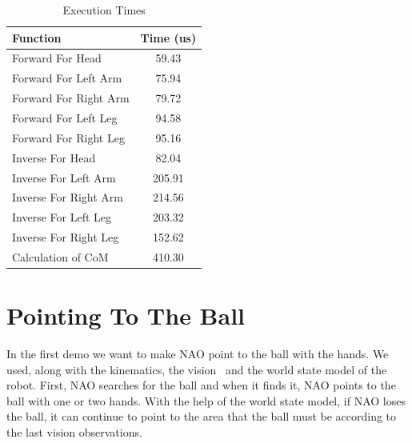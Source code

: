 \begin{table}[!h]
\centering
\caption{Execution Times}
\vspace*{0.06cm}
\begin{tabular}{|l|c|}
\hline
\textbf{Function} & \textbf{Time (us)}\\ \hline
Forward For Head & 59.43 \\
Forward For Left Arm & 75.94 \\
Forward For Right Arm & 79.72 \\
Forward For Left Leg & 94.58 \\
Forward For Right Leg & 95.16 \\
Inverse For Head & 82.04 \\
Inverse For Left Arm & 205.91 \\
Inverse For Right Arm & 214.56 \\
Inverse For Left Leg & 203.32 \\
Inverse For Right Leg & 152.62 \\
Calculation of CoM & 410.30 \\
\hline
\end{tabular}
\label{times}
\end{table}

\section{Pointing To The Ball}
In the first demo we want to make NAO point to the ball with the hands. We used, along with the kinematics, the vision~\cite{orfanoudakis2011} and the world state model of the robot. First, NAO searches for the ball and when it finds it, NAO points to the ball with one or two hands. With the help of the world state model, if NAO loses the ball, it can continue to point to the area that the ball must be according to the last vision observations.

